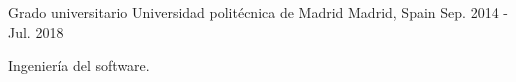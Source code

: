 

\begin{cventries}

  \cventry
  {Grado universitario} %
  {Universidad politécnica de Madrid} %
  {Madrid, Spain} %
  {Sep. 2014 - Jul. 2018} %
  {
    \begin{cvitems} %
      \item {Ingeniería del software.}
    \end{cvitems}
  }

\end{cventries}
